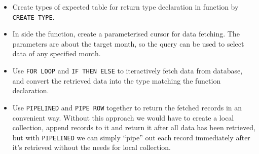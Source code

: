 \documentclass[
  a4paper,
]{article}
\providecommand{\tightlist}{%
  \setlength{\itemsep}{0pt}\setlength{\parskip}{0pt}}
\begin{document}
\begin{itemize}
\tightlist
\item
  Create types of expected table for return type declaration in function
  by \texttt{CREATE\ TYPE}.
\item
  In side the function, create a parameterised cursor for data fetching.
  The parameters are about the target month, so the query can be used to
  select data of any specified month.
\item
  Use \texttt{FOR\ LOOP} and \texttt{IF\ THEN\ ELSE} to iteractively
  fetch data from database, and convert the retrieved data into the type
  matching the function declaration.
\item
  Use \texttt{PIPELINED} and \texttt{PIPE\ ROW} together to return the
  fetched records in an convenient way. Without this approach we would
  have to create a local collection, append records to it and return it
  after all data has been retrieved, but with \texttt{PIPELINED} we can
  simply ``pipe'' out each record immediately after it's retrieved
  without the needs for local collection.
\end{itemize}

\printbibliography
\end{document}

